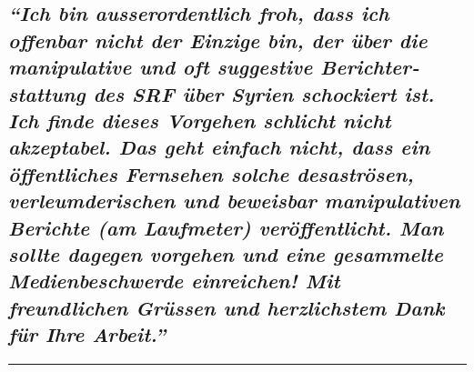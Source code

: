 \hypertarget{ich-bin-ausserordentlich-froh-dass-ich-offenbar-nicht-der-einzige-bin-der-uxfcber-die-manipulative-und-oft-suggestive-berichterstattung-des-srf-uxfcber-syrien-schockiert-ist-ich-finde-dieses-vorgehen-schlicht-nicht-akzeptabel-das-geht-einfach-nicht-dass-ein-uxf6ffentliches-fernsehen-solche-desastruxf6sen-verleumderischen-und-beweisbar-manipulativen-berichte-am-laufmeter-veruxf6ffentlicht-man-sollte-dagegen-vorgehen-und-eine-gesammelte-medienbeschwerde-einreichen-mit-freundlichen-gruxfcssen-und-herzlichstem-dank-fuxfcr-ihre-arbeit}{%
\subsection{\texorpdfstring{\emph{``Ich bin ausser­ordent­lich froh,
dass ich offenbar nicht der Einzige bin, der über die manipulative und
oft suggestive Bericht­er­stattung des SRF über Syrien schockiert ist.
Ich finde dieses Vorgehen schlicht nicht akzeptabel. Das geht einfach
nicht, dass ein öffentliches Fernsehen solche desaströsen,
verleum­de­rischen und beweis­bar mani­pu­la­tiven Berichte (am
Laufmeter) veröffentlicht. Man sollte dagegen vorgehen und eine
gesammelte Medien­be­schwerde einreichen! Mit freundlichen Grüssen und
herzlichstem Dank für Ihre
Arbeit.''}}{``Ich bin ausser­ordent­lich froh, dass ich offenbar nicht der Einzige bin, der über die manipulative und oft suggestive Bericht­er­stattung des SRF über Syrien schockiert ist. Ich finde dieses Vorgehen schlicht nicht akzeptabel. Das geht einfach nicht, dass ein öffentliches Fernsehen solche desaströsen, verleum­de­rischen und beweis­bar mani­pu­la­tiven Berichte (am Laufmeter) veröffentlicht. Man sollte dagegen vorgehen und eine gesammelte Medien­be­schwerde einreichen! Mit freundlichen Grüssen und herzlichstem Dank für Ihre Arbeit.''}}\label{ich-bin-ausserordentlich-froh-dass-ich-offenbar-nicht-der-einzige-bin-der-uxfcber-die-manipulative-und-oft-suggestive-berichterstattung-des-srf-uxfcber-syrien-schockiert-ist-ich-finde-dieses-vorgehen-schlicht-nicht-akzeptabel-das-geht-einfach-nicht-dass-ein-uxf6ffentliches-fernsehen-solche-desastruxf6sen-verleumderischen-und-beweisbar-manipulativen-berichte-am-laufmeter-veruxf6ffentlicht-man-sollte-dagegen-vorgehen-und-eine-gesammelte-medienbeschwerde-einreichen-mit-freundlichen-gruxfcssen-und-herzlichstem-dank-fuxfcr-ihre-arbeit}}

\begin{center}\rule{0.5\linewidth}{\linethickness}\end{center}

